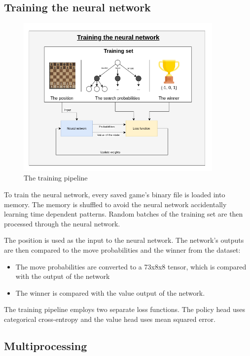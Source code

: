 \documentclass{article}
\begin{document}
\subsection{Training the neural network}

\begin{figure}[H]
    \centering
    \includegraphics[width=0.9\textwidth]{img/training.png}
    \caption{The training pipeline}
\end{figure}

To train the neural network, every saved game's binary file is loaded 
into memory. The memory is shuffled to avoid the neural network accidentally learning
time dependent patterns. Random batches of the training set are then processed through the
neural network.

The position is used as the input to the neural network. The network's outputs are then 
compared to the move probabilities and the winner from the dataset:

\begin{itemize}
    \item The move probabilities are converted to a 73x8x8 tensor, which is compared with the output of the network
    \item The winner is compared with the value output of the network.
\end{itemize}

The training pipeline employs two separate loss functions. The policy head uses categorical cross-entropy
and the value head uses mean squared error.

\subsection{Multiprocessing}
\end{document}
